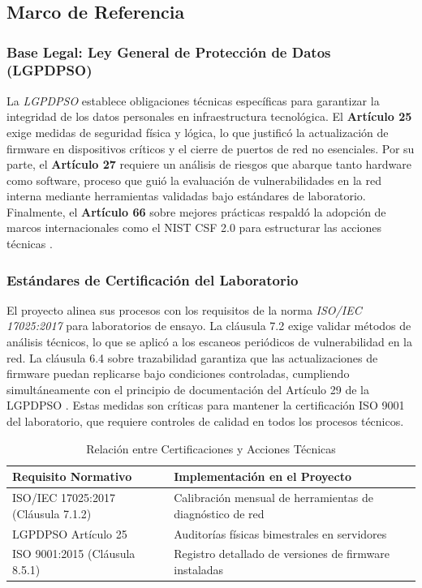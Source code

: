 \section{}
\setcounter{subsection}{1}
\subsection{Marco de Referencia}
\subsubsection{Base Legal: Ley General de Protección de Datos (LGPDPSO)}  
La \textit{LGPDPSO} establece obligaciones técnicas específicas para garantizar la integridad de los datos personales en infraestructura tecnológica. El \textbf{Artículo 25} exige medidas de seguridad física y lógica, lo que justificó la actualización de firmware en dispositivos críticos y el cierre de puertos de red no esenciales. Por su parte, el \textbf{Artículo 27} requiere un análisis de riesgos que abarque tanto hardware como software, proceso que guió la evaluación de vulnerabilidades en la red interna mediante herramientas validadas bajo estándares de laboratorio. Finalmente, el \textbf{Artículo 66} sobre mejores prácticas respaldó la adopción de marcos internacionales como el NIST CSF 2.0 para estructurar las acciones técnicas \cite{LGPDPSO}.

\subsubsection{Estándares de Certificación del Laboratorio}  
El proyecto alinea sus procesos con los requisitos de la norma \textit{ISO/IEC 17025:2017} \cite{iso_17025_2017} para laboratorios de ensayo. La cláusula 7.2 exige validar métodos de análisis técnicos, lo que se aplicó a los escaneos periódicos de vulnerabilidad en la red. La cláusula 6.4 sobre trazabilidad garantiza que las actualizaciones de firmware puedan replicarse bajo condiciones controladas, cumpliendo simultáneamente con el principio de documentación del Artículo 29 de la LGPDPSO \cite{LGPDPSO}. Estas medidas son críticas para mantener la certificación ISO 9001 del laboratorio, que requiere controles de calidad en todos los procesos técnicos.

\begin{table}[h]
	\centering
	\caption{Relación entre Certificaciones y Acciones Técnicas}
	\label{tab:certificaciones}
	\begin{tabularx}{\textwidth}{|>{\raggedright\arraybackslash}X|>{\raggedright\arraybackslash}X|}
		\hline
		\textbf{Requisito Normativo} & \textbf{Implementación en el Proyecto} \\ \hline
		ISO/IEC 17025:2017 (Cláusula 7.1.2) & Calibración mensual de herramientas de diagnóstico de red \\ \hline
		LGPDPSO Artículo 25 & Auditorías físicas bimestrales en servidores \\ \hline
		ISO 9001:2015 (Cláusula 8.5.1) & Registro detallado de versiones de firmware instaladas \\ \hline
	\end{tabularx}
\end{table}

